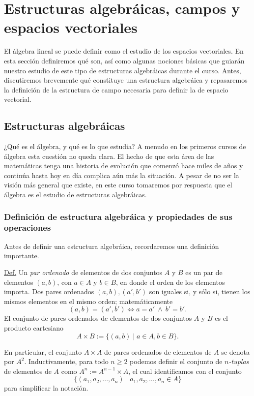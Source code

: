 \documentclass[apuntes]{subfiles}
\begin{document}
\section{Estructuras algebráicas, campos y espacios vectoriales} \label{Sec: Estructuras algebráicas, campos y espacios vectoriales}

El álgebra lineal se puede definir como el estudio de los espacios vectoriales. En esta sección definiremos qué son, así como algunas nociones básicas que guiarán nuestro estudio de este tipo de estructuras algebráicas durante el curso. Antes, discutiremos brevemente qué constituye una estructura algebráica y repasaremos la definición de la estructura de campo \textemdash necesaria para definir la de espacio vectorial.

\subsection*{Estructuras algebráicas} \label{Subsec: Estructuras algebráicas}

¿Qué es el álgebra, y qué es lo que estudia? A menudo en los primeros cursos de álgebra esta cuestión no queda clara. El hecho de que esta área de las matemáticas tenga una historia de evolución que comenzó hace miles de años y continúa hasta hoy en día complica aún más la situación. A pesar de no ser la visión más general que existe, en este curso tomaremos por respuesta que el álgebra es el estudio de estructuras algebráicas.

\subsubsection*{Definición de estructura algebráica y propiedades de sus operaciones} \label{Sssec: Definición de estructura algebráica y propiedades de sus operaciones}

Antes de definir una estructura algebráica, recordaremos una definición importante.

\begin{tcolorbox}\label{Def: Par ordenado}
    \underline{Def.} Un \emph{par ordenado} de elementos de dos conjuntos $A$ y $B$ es un par de elementos $(a,b)$, con $a\in A$ y $b\in B$, en donde el orden de los elementos importa. Dos pares ordenados $(a,b), (a',b')$ son iguales si, y sólo si, tienen los mismos elementos en el mismo orden; matemáticamente
    \[
    (a,b)=(a',b')\iff a=a' \ \land \ b'=b'.
    \]
    El conjunto de pares ordenados de elementos de dos conjuntos $A$ y $B$ es el producto cartesiano
    \[
    A\times B:= \{(a,b) \mid a\in A, b\in B\}.
    \] 

    En particular, el conjunto $A\times A$ de pares ordenados de elementos de $A$ se denota por $A^2$. Inductivamente, para todo $n\ge 2$ podemos definir el conjunto de \emph{$n$-tuplas} de elementos de $A$ como $A^n:= A^{n-1}\times A$, el cual identificamos con el conjunto
    \[
        \{(a_1,a_2,...,a_n) \mid a_1,a_2,...,a_n\in A\}
    \] 
    para simplificar la notación.
        
\end{tcolorbox}
\end{document}
